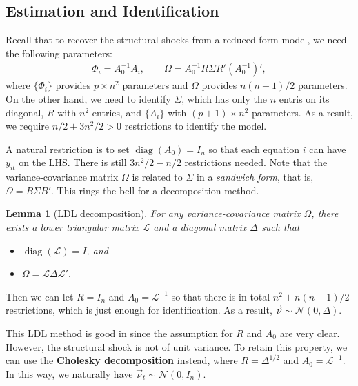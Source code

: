 \documentclass[12pt]{article}
\newtheorem{lemma}[theorem]{Lemma}
\begin{document}
\subsection{Estimation and Identification}
Recall that to recover the structural shocks from a reduced-form model, we need the following parameters:
\begin{align*}
    \Phi_i = A_0^{-1} A_i, \qquad \Omega = A_0^{-1} R \Sigma R' (A_0^{-1})',
\end{align*}
where $\{\Phi_i\}$ provides $p \times n^2$ parameters and $\Omega$ provides $n(n+1)/2$ parameters. On the other hand, we need to identify $\Sigma$, which has only the $n$ entris on its diagonal, $R$ with $n^2$ entries, and $\{A_i\}$ with $(p+1) \times n^2$ parameters. As a result, we require $n/2 + 3n^2/2 > 0$ restrictions to identify the model. 

A natural restriction is to set $\operatorname{diag}(A_0) = I_n$ so that each equation $i$ can have $y_{it}$ on the LHS. There is still $3n^2/2 - n/2$ restrictions needed. Note that the variance-covariance matrix $\Omega$ is related to $\Sigma$ in a \textit{sandwich form}, that is, $\Omega = B \Sigma B'$. This rings the bell for a decomposition method.
\begin{lemma}[LDL decomposition]
    For any variance-covariance matrix $\Omega$, there exists a lower triangular matrix $\mathcal{L}$ and a diagonal matrix $\Delta$ such that 
    \begin{itemize}
        \item $\operatorname{diag}(\mathcal{L}) = I$, and
        \item $\Omega = \mathcal{L} \Delta \mathcal{L}'$.
    \end{itemize}
\end{lemma}
Then we can let $R = I_n$ and $A_0 = \mathcal{L}^{-1}$ so that there is in total $n^2 + n(n-1)/2$ restrictions, which is just enough for identification. As a result, $\vec{\nu}\sim \mathcal{N}(0, \Delta)$.

This LDL method is good in since the assumption for $R$ and $A_0$ are very clear. However, the structural shock is not of unit variance. To retain this property, we can use the \textbf{Cholesky decomposition} instead, where $R = \Delta ^{1/2}$ and $A_0 = \mathcal{L}^{-1}$. In this way, we naturally have $\vec{\nu}_t \sim \mathcal{N}(0, I_n)$.
\end{document}
